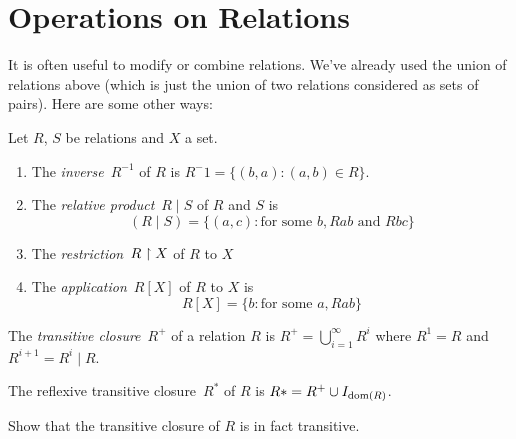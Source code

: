 \documentclass[open-logic-section]{subfiles}
\begin{document}
\section{Operations on Relations}

It is often useful to modify or combine relations. We've already used
the union of relations above (which is just the union of two relations
considered as sets of pairs). Here are some other ways:

\begin{defn} Let $R$, $S$ be relations and $X$ a set.
\begin{enumerate}
\item The \emph{inverse}~$R^{-1}$ of $R$ is $R^-1 = \{ (b, a) : (a, b)
  \in R\}$.
\item The \emph{relative product}~$R \mid S$ of $R$ and $S$ is 
\[
(R \mid S) = \{(a, c) : \text{for some }b, Rab \text{ and } Rbc\}
\]
\item The \emph{restriction}~$R \upharpoonright X$ of $R$ to $X$
\item The \emph{application}~$R[X]$ of $R$ to $X$ is
\[
R[X] = \{b : \text{for some }a, Rab\}
\]
\end{enumerate}
\end{defn}

\begin{defn}
The \emph{transitive closure}~$R^+$ of a relation $R$ is $R^+ =
\bigcup_{i=1}^\infty R^i$ where $R^1 = R$ and $R^{i+1} = R^i \mid R$.

The reflexive transitive closure~$R^*$ of $R$ is $R* = R^+ \cup
I_{\mathrm{dom}(R)}$.
\end{defn}

\begin{prob}
Show that the transitive closure of $R$ is in fact transitive.
\end{prob}
\end{document}
